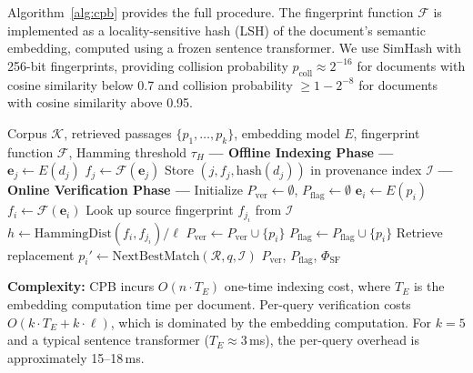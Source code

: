 \documentclass[journal,10pt]{IEEEtran}
\newcommand{\calR}{\mathcal{R}}
\newcommand{\calF}{\mathcal{F}}
\newcommand{\calK}{\mathcal{K}}
\newcommand{\calI}{\mathcal{I}}
\begin{document}
Algorithm~\ref{alg:cpb} provides the full procedure. The fingerprint function $\calF$ is implemented as a locality-sensitive hash (LSH) of the document's semantic embedding, computed using a frozen sentence transformer. We use SimHash with 256-bit fingerprints, providing collision probability $p_{\text{coll}} \approx 2^{-16}$ for documents with cosine similarity below 0.7 and collision probability $\geq 1 - 2^{-8}$ for documents with cosine similarity above 0.95.

\begin{algorithm}[t]
\caption{Cryptographic Provenance Binding (CPB)}
\label{alg:cpb}
\begin{algorithmic}[1]
\REQUIRE Corpus $\calK$, retrieved passages $\{p_1, \ldots, p_k\}$, embedding model $E$, fingerprint function $\calF$, Hamming threshold $\tau_H$
\STATE \textbf{--- Offline Indexing Phase ---}
\FOR{each document $d_j \in \calK$}
    \STATE $\mathbf{e}_j \gets E(d_j)$ \hfill{}
    \STATE $f_j \gets \calF(\mathbf{e}_j)$ \hfill{}
    \STATE Store $(j, f_j, \text{hash}(d_j))$ in provenance index $\calI$
\ENDFOR
\STATE \textbf{--- Online Verification Phase ---}
\STATE Initialize $P_{\text{ver}} \gets \emptyset$, $P_{\text{flag}} \gets \emptyset$
    \STATE $\mathbf{e}_i \gets E(p_i)$
    \STATE $f_i \gets \calF(\mathbf{e}_i)$
    \STATE Look up source fingerprint $f_{j_i}$ from $\calI$
    \STATE $h \gets \text{HammingDist}(f_i, f_{j_i}) / \ell$
        \STATE $P_{\text{ver}} \gets P_{\text{ver}} \cup \{p_i\}$
    \ELSE
        \STATE $P_{\text{flag}} \gets P_{\text{flag}} \cup \{p_i\}$
        \STATE Retrieve replacement $p_i' \gets \text{NextBestMatch}(\calR, q, \calI)$
    \ENDIF
\ENDFOR
\RETURN $P_{\text{ver}}$, $P_{\text{flag}}$, $\Phi_{\text{SF}}$
\end{algorithmic}
\end{algorithm}

\textbf{Complexity:} CPB incurs $O(n \cdot T_E)$ one-time indexing cost, where $T_E$ is the embedding computation time per document. Per-query verification costs $O(k \cdot T_E + k \cdot \ell)$, which is dominated by the embedding computation. For $k = 5$ and a typical sentence transformer ($T_E \approx 3$\,ms), the per-query overhead is approximately 15--18\,ms.
\end{document}
